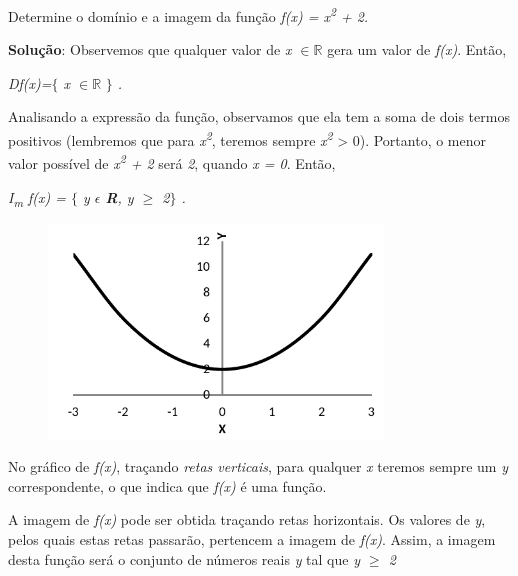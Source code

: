 \begin{texemplo}
Determine o domínio e a imagem da função \textit{ f(x) = x\textsuperscript{2} + 2.}

\textbf{Solução}:  Observemos que qualquer valor de \textit{x $ \in \mathbb{R} $} gera um valor de \textit{f(x)}. Então, 

\tab  \textit{Df(x)=$ \{ $ x $ \in \mathbb{R} $   } \textit{$ \} $ .}

Analisando a expressão da função, observamos que ela tem a soma de dois termos positivos (lembremos que para \textit{x\textsuperscript{2}}, teremos sempre \textit{x\textsuperscript{2}} > 0). Portanto, o menor valor possível de \textit{x\textsuperscript{2} + 2 } será \textit{2}, quando \textit{x = 0}. Então, 

\textit{I\textsubscript{m} f(x) = $ \{ $  y $ \epsilon $   \textbf{R}, y $ \geq $  2$ \} $ .}

\begin{figure}[H]
	\begin{Center}
		\includegraphics[width=3.5in,height=2.24in]{capitulos/funcao_do_primeiro_grau/media/image8.pdf}
	\end{Center}
\end{figure}

No gráfico de \textit{f(x)}, traçando \textit{retas verticais}, para qualquer \textit{x} teremos sempre um \textit{y} correspondente, o que indica que \textit{f(x)} é uma função.  

A imagem de \textit{f(x)} pode ser obtida traçando retas horizontais. Os valores de \textit{y}, pelos quais estas retas passarão, pertencem a imagem de \textit{f(x)}. Assim, a imagem desta função será o conjunto de números reais \textit{y }tal que  \textit{y $ \geq $  2 }\qedsymbol{}
\end{texemplo}

